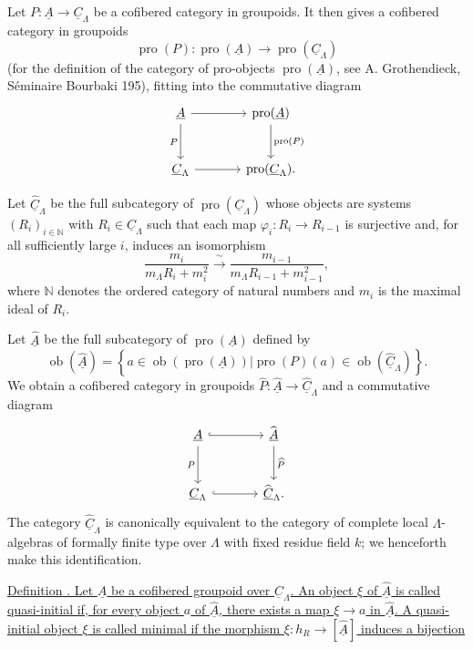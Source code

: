 
Let $P:\underline A\longrightarrow\underline C_\Lambda$ be a
cofibered category in groupoids. It then gives a cofibered category in
groupoids
\[
 \operatorname{pro}(P):\operatorname{pro}(\underline A)
 \longrightarrow\operatorname{pro}(\underline C_\Lambda)
\]
(for the definition of the category of pro-objects
$\operatorname{pro}(\underline A)$, see A. Grothendieck,
S\'eminaire Bourbaki 195), fitting into the commutative diagram
\[
\begin{tikzcd}[column sep=large,row sep=large]
\underline A \arrow[r] \arrow[d,"P"']
 & \operatorname{pro}(\underline A)
   \arrow[d,"\operatorname{pro}(P)"] \\
\underline C_\Lambda \arrow[r]
 & \operatorname{pro}(\underline C_\Lambda).
\end{tikzcd}
\]

Let $\widehat{\underline C}_\Lambda$ be the full subcategory of
$\operatorname{pro}(\underline C_\Lambda)$ whose objects are systems
$(R_i)_{i\in\mathbb N}$ with $R_i\in\underline C_\Lambda$ such that
each map $\varphi_i:R_i\longrightarrow R_{i-1}$ is surjective and,
for all sufficiently large $i$, induces an isomorphism
\[
 \frac{m_i}{m_\Lambda R_i+m_i^2}
 \xrightarrow{\ \sim\ }
 \frac{m_{i-1}}{m_\Lambda R_{i-1}+m_{i-1}^2},
\]
where $\mathbb N$ denotes the ordered category of natural numbers and
$m_i$ is the maximal ideal of $R_i$.

Let $\widehat{\underline A}$ be the full subcategory of
$\operatorname{pro}(\underline A)$ defined by
\[
 \operatorname{ob}(\widehat{\underline A})=
 \left\{a\in\operatorname{ob}(\operatorname{pro}(\underline A))
 \mathrel{\Big|}
 \operatorname{pro}(P)(a)\in
 \operatorname{ob}(\widehat{\underline C}_\Lambda)\right\}.
\]
We obtain a cofibered category in groupoids
$\widehat P:\widehat{\underline A}\longrightarrow
\widehat{\underline C}_\Lambda$ and a commutative diagram
\[
\begin{tikzcd}[column sep=large,row sep=large]
\underline A \arrow[r,hook] \arrow[d,"P"']
 & \widehat{\underline A} \arrow[d,"\widehat P"] \\
\underline C_\Lambda \arrow[r,hook]
 & \widehat{\underline C}_\Lambda.
\end{tikzcd}
\]
The category $\widehat{\underline C}_\Lambda$ is canonically
equivalent to the category of complete local $\Lambda$-algebras of
formally finite type over $\Lambda$ with fixed residue field $k$; we
henceforth make this identification.

\underline{Definition . Let $\underline A$ be a cofibered groupoid
over $\underline C_\Lambda$. An object $\xi$ of
$\widehat{\underline A}$ is called quasi-initial if, for every object
$a$ of $\widehat{\underline A}$, there exists a map $\xi\to a$ in
$\widehat{\underline A}$. A quasi-initial object $\xi$ is called
minimal if the morphism
$\xi:h_R\longrightarrow[\widehat{\underline A}]$ induces a bijection}


